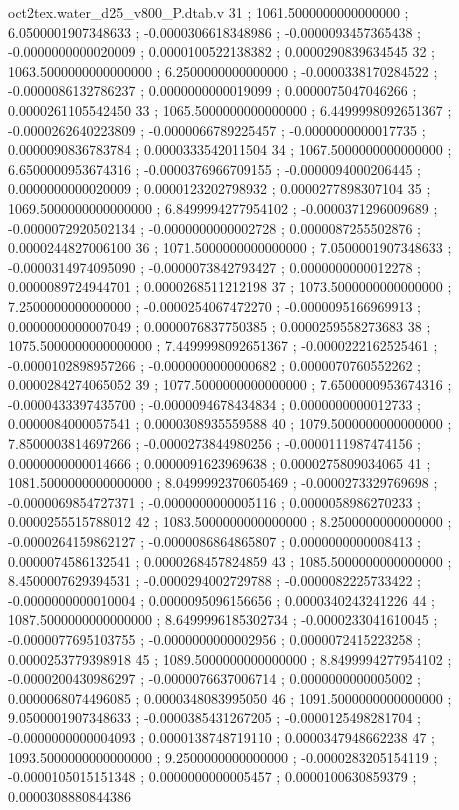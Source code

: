 \begin{filecontents}[overwrite]{oct2tex.water_d25_v800_P.dtab.v}
31 ; 1061.5000000000000000 ; 6.0500001907348633 ; -0.0000306618348986 ; -0.0000093457365438 ; -0.0000000000020009 ; 0.0000100522138382 ; 0.0000290839634545
32 ; 1063.5000000000000000 ; 6.2500000000000000 ; -0.0000338170284522 ; -0.0000086132786237 ; 0.0000000000019099 ; 0.0000075047046266 ; 0.0000261105542450
33 ; 1065.5000000000000000 ; 6.4499998092651367 ; -0.0000262640223809 ; -0.0000066789225457 ; -0.0000000000017735 ; 0.0000090836783784 ; 0.0000333542011504
34 ; 1067.5000000000000000 ; 6.6500000953674316 ; -0.0000376966709155 ; -0.0000094000206445 ; 0.0000000000020009 ; 0.0000123202798932 ; 0.0000277898307104
35 ; 1069.5000000000000000 ; 6.8499994277954102 ; -0.0000371296009689 ; -0.0000072920502134 ; -0.0000000000002728 ; 0.0000087255502876 ; 0.0000244827006100
36 ; 1071.5000000000000000 ; 7.0500001907348633 ; -0.0000314974095090 ; -0.0000073842793427 ; 0.0000000000012278 ; 0.0000089724944701 ; 0.0000268511212198
37 ; 1073.5000000000000000 ; 7.2500000000000000 ; -0.0000254067472270 ; -0.0000095166969913 ; 0.0000000000007049 ; 0.0000076837750385 ; 0.0000259558273683
38 ; 1075.5000000000000000 ; 7.4499998092651367 ; -0.0000222162525461 ; -0.0000102898957266 ; -0.0000000000000682 ; 0.0000070760552262 ; 0.0000284274065052
39 ; 1077.5000000000000000 ; 7.6500000953674316 ; -0.0000433397435700 ; -0.0000094678434834 ; 0.0000000000012733 ; 0.0000084000057541 ; 0.0000308935559588
40 ; 1079.5000000000000000 ; 7.8500003814697266 ; -0.0000273844980256 ; -0.0000111987474156 ; 0.0000000000014666 ; 0.0000091623969638 ; 0.0000275809034065
41 ; 1081.5000000000000000 ; 8.0499992370605469 ; -0.0000273329769698 ; -0.0000069854727371 ; -0.0000000000005116 ; 0.0000058986270233 ; 0.0000255515788012
42 ; 1083.5000000000000000 ; 8.2500000000000000 ; -0.0000264159862127 ; -0.0000086864865807 ; 0.0000000000008413 ; 0.0000074586132541 ; 0.0000268457824859
43 ; 1085.5000000000000000 ; 8.4500007629394531 ; -0.0000294002729788 ; -0.0000082225733422 ; -0.0000000000010004 ; 0.0000095096156656 ; 0.0000340243241226
44 ; 1087.5000000000000000 ; 8.6499996185302734 ; -0.0000233041610045 ; -0.0000077695103755 ; -0.0000000000002956 ; 0.0000072415223258 ; 0.0000253779398918
45 ; 1089.5000000000000000 ; 8.8499994277954102 ; -0.0000200430986297 ; -0.0000076637006714 ; 0.0000000000005002 ; 0.0000068074496085 ; 0.0000348083995050
46 ; 1091.5000000000000000 ; 9.0500001907348633 ; -0.0000385431267205 ; -0.0000125498281704 ; -0.0000000000004093 ; 0.0000138748719110 ; 0.0000347948662238
47 ; 1093.5000000000000000 ; 9.2500000000000000 ; -0.0000283205154119 ; -0.0000105015151348 ; 0.0000000000005457 ; 0.0000100630859379 ; 0.0000308880844386

\end{filecontents}
